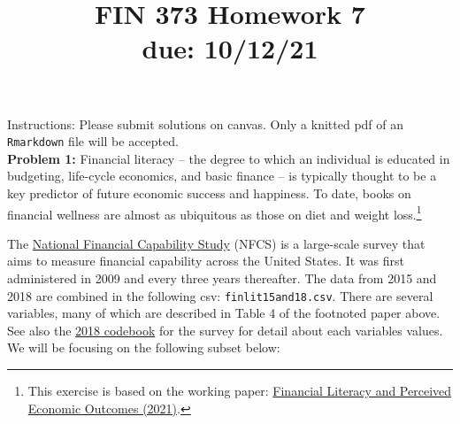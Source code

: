 \documentclass[11pt]{article}
\begin{document}
\title{FIN 373 Homework 7 \\ {\large due: \textbf{10/12/21}}}
\date{}
\maketitle

\vspace{-20mm}

\noindent Instructions: Please submit solutions on canvas.  Only a knitted pdf of an {\tt Rmarkdown} file will be accepted.
\\

\noindent \textbf{Problem 1:} Financial literacy -- the degree to which an individual is educated in budgeting, life-cycle economics, and basic finance -- is typically thought to be a key predictor of future economic success and happiness.  To date, books on financial wellness are almost as ubiquitous as those on diet and weight loss.\footnote{This exercise is based on the working paper: \href{https://papers.ssrn.com/sol3/papers.cfm?abstract_id=3302978}{Financial Literacy and Perceived Economic Outcomes (2021)}.}

The \href{https://gflec.org/initiatives/national-financial-capability-study/}{National Financial Capability Study} (NFCS) is a large-scale survey that aims to measure financial capability across the United States.  It was first administered in 2009 and every three years thereafter.  The data from 2015 and 2018 are combined in the following csv: {\tt finlit15and18.csv}.  There are several variables, many of which are described in Table 4 of the footnoted paper above.  See also the \href{https://github.com/dpuelz/Policy-Research-Laboratory/blob/main/readings/2018NFCScodebook.pdf}{2018 codebook} for the survey for detail about each variables values.  We will be focusing on the following subset below:
\end{document}
